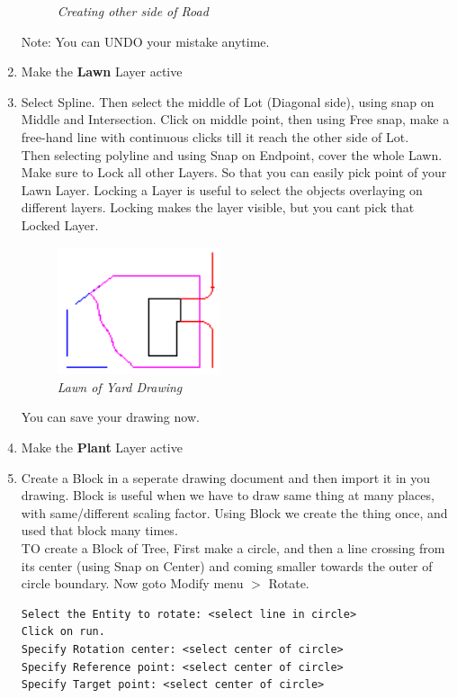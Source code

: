 \begin{enumerate}
{\begin{figure}[h!]
       \caption{\small \sl Creating other side of Road}
       \end{figure}
       Note: You can UNDO your mistake anytime.}
\item{Make the \textbf{Lawn} Layer active}
\item{Select Spline. Then select the middle of Lot (Diagonal side), using snap on Middle and Intersection. Click on middle point, then using Free snap, make a free-hand line with continuous clicks till it reach the other side of Lot.
\\Then selecting polyline and using Snap on Endpoint, cover the whole Lawn. Make sure to Lock all other Layers. So that you can easily pick point of your Lawn Layer. Locking a Layer is useful to select the objects overlaying on different layers. Locking makes the layer visible, but you cant pick that Locked Layer.
\begin{figure}[h!]
       \centering\includegraphics[width=180px]{./images-yard/lawn-full.png}
       \caption{\small \sl Lawn of Yard Drawing}
       \end{figure}
You can save your drawing now.}
\item{Make the \textbf{Plant} Layer active}
\item{Create a Block in a seperate drawing document and then import it in you drawing. Block is useful when we have to draw same thing at many places, with same/different scaling factor. Using Block we create the thing once, and used that block many times.\\
TO create a Block of Tree, First make a circle, and then a line crossing from its center (using Snap on Center) and coming smaller towards the outer of circle boundary. Now goto Modify menu $>$ Rotate. 
\begin{verbatim}
Select the Entity to rotate: <select line in circle>
Click on run.
Specify Rotation center: <select center of circle>
Specify Reference point: <select center of circle>
Specify Target point: <select center of circle>
\end{verbatim}
\vspace{.2in}
\begin{figure}[h!]

\end{figure}}
\end{enumerate}
